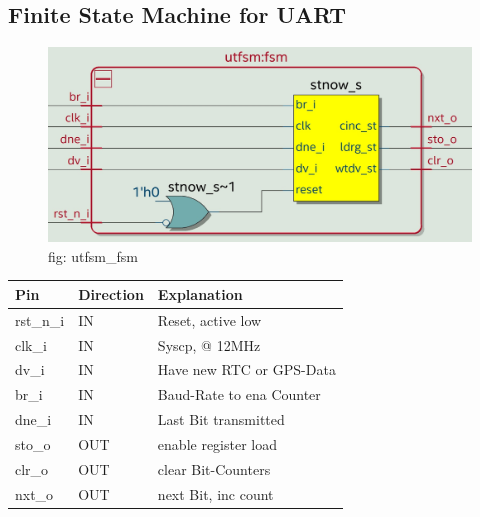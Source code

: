 \documentclass[12pt,a4 paper] {report}
\begin{document}
\newpage

\subsection{Finite State Machine for UART}
\begin{figure}[h]
	\centering	
	\includegraphics[scale=0.2]{../png/utfsm_fsm.png}
	\newline
	fig: utfsm\_fsm\\
\end{figure}

\begin{center}
	\begin{tabular}{| p{2cm} | p{2cm} | p{4cm} |}
		\hline
		Pin & Direction  & Explanation\\
		\hline	
		rst\_n\_i & IN  & Reset, active low\\
		\hline
		clk\_i   & IN  & Syscp, @ 12MHz \\
		\hline
		dv\_i    & IN  & Have new RTC or GPS-Data\\
		\hline
		br\_i    & IN  & Baud-Rate to ena Counter\\
		\hline
		dne\_i   & IN  & Last Bit transmitted\\
		\hline
		sto\_o   & OUT & enable register load\\
		\hline
		clr\_o   & OUT & clear Bit-Counters\\
		\hline
		nxt\_o   & OUT & next Bit, inc count\\
		\hline
		
	\end{tabular}
\end{center}
\newpage
\end{document}
